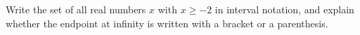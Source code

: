 Write the set of all real numbers $x$ with $x\ge-2$ in interval notation, and explain whether the endpoint at infinity is written with a bracket or a parenthesis.
